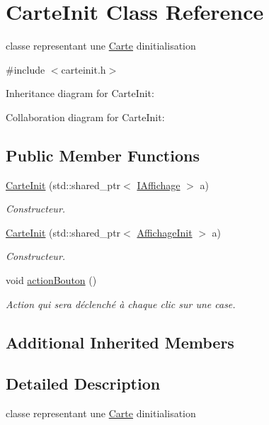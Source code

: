 \hypertarget{class_carte_init}{}\section{Carte\+Init Class Reference}
\label{class_carte_init}


classe representant une \hyperlink{class_carte}{Carte} d\textquotesingle{}initialisation  




{\ttfamily \#include $<$carteinit.\+h$>$}



Inheritance diagram for Carte\+Init\+:


Collaboration diagram for Carte\+Init\+:
\subsection*{Public Member Functions}
\begin{DoxyCompactItemize}
\item 
\hyperlink{class_carte_init_a54477b5d1d1662f277b70cb2d6efce27}{Carte\+Init} (std\+::shared\+\_\+ptr$<$ \hyperlink{class_i_affichage}{I\+Affichage} $>$ a)
\begin{DoxyCompactList}\small\item\em Constructeur. \end{DoxyCompactList}\item 
\hyperlink{class_carte_init_a5e91e2c7caa1772484fb19aca3ba1a80}{Carte\+Init} (std\+::shared\+\_\+ptr$<$ \hyperlink{class_affichage_init}{Affichage\+Init} $>$ a)
\begin{DoxyCompactList}\small\item\em Constructeur. \end{DoxyCompactList}\item 
void \hyperlink{class_carte_init_a48844f800556030890bdc4d5933a3573}{action\+Bouton} ()
\begin{DoxyCompactList}\small\item\em Action qui sera déclenché à chaque clic sur une case. \end{DoxyCompactList}\end{DoxyCompactItemize}
\subsection*{Additional Inherited Members}


\subsection{Detailed Description}
classe representant une \hyperlink{class_carte}{Carte} d\textquotesingle{}initialisation 

